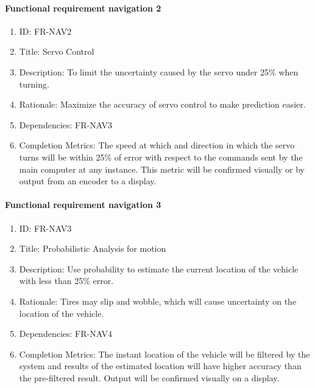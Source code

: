 \documentclass[compsoc,draftclsnofoot,onecolumn,10pt]{IEEEtran}
\begin{document}
	\paragraph{Functional requirement navigation 2}
		\begin{enumerate}
			\item ID: FR-NAV2
			\item Title: Servo Control
			\item Description: To limit the uncertainty caused by the servo under 25\% when turning.
			\item Rationale: Maximize the accuracy of servo control to make prediction easier.
			\item Dependencies: FR-NAV3
			\item Completion Metrics: The speed at which and direction in which the servo turns will be within 25\% of error with respect to the commands sent by the main computer at any instance. 
			This metric will be confirmed visually or by output from an encoder to a display.
		\end{enumerate}

	\paragraph{Functional requirement navigation 3}
		\begin{enumerate}
			\item ID: FR-NAV3
			\item Title: Probabilistic Analysis for motion
			\item Description: Use probability to estimate the current location of the vehicle with less than 25\% error.
			\item Rationale: Tires may slip and wobble, which will cause uncertainty on the location of the vehicle.
			\item Dependencies: FR-NAV4
			\item Completion Metrics: The instant location of the vehicle will be filtered by the system and results of the estimated location will have higher accuracy than the pre-filtered result. Output will be confirmed visually on a display. 
		\end{enumerate}
\end{document}

